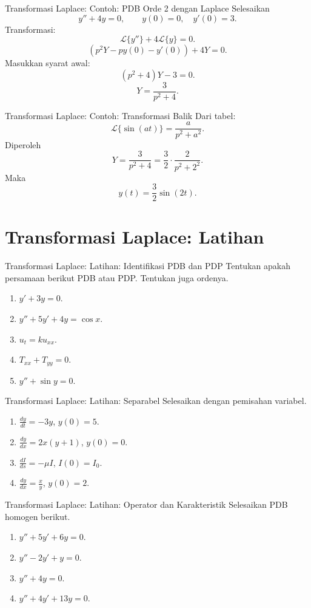 \documentclass[aspectratio=169,11pt]{beamer}
\newcommand{\Lap}{\mathcal{L}}
\begin{document}
\begin{frame}{Transformasi Laplace: Contoh: PDB Orde 2 dengan Laplace}
Selesaikan
\[
y''+4y=0,\qquad y(0)=0,\quad y'(0)=3.
\]
Transformasi:
\[
\Lap\{y''\}+4\Lap\{y\}=0.
\]
\[
(p^2Y-py(0)-y'(0))+4Y=0.
\]
Masukkan syarat awal:
\[
(p^2+4)Y-3=0.
\]
\[
Y=\frac{3}{p^2+4}.
\]
\end{frame}

\begin{frame}{Transformasi Laplace: Contoh: Transformasi Balik}
Dari tabel:
\[
\Lap\{\sin(at)\}=\frac{a}{p^2+a^2}.
\]
Diperoleh
\[
Y=\frac{3}{p^2+4}=\frac{3}{2}\cdot\frac{2}{p^2+2^2}.
\]
Maka
\[
\boxed{y(t)=\frac{3}{2}\sin(2t).}
\]
\end{frame}

\section{Transformasi Laplace: Latihan}

\begin{frame}{Transformasi Laplace: Latihan: Identifikasi PDB dan PDP}
Tentukan apakah persamaan berikut PDB atau PDP. Tentukan juga ordenya.
\begin{enumerate}
  \item $y'+3y=0$.
  \item $y''+5y'+4y=\cos x$.
  \item $u_t=ku_{xx}$.
  \item $T_{xx}+T_{yy}=0$.
  \item $y''+\sin y=0$.
\end{enumerate}
\end{frame}

\begin{frame}{Transformasi Laplace: Latihan: Separabel}
Selesaikan dengan pemisahan variabel.
\begin{enumerate}
  \item $\displaystyle \frac{dy}{dt}=-3y$, $y(0)=5$.
  \item $\displaystyle \frac{dy}{dx}=2x(y+1)$, $y(0)=0$.
  \item $\displaystyle \frac{dI}{ds}=-\mu I$, $I(0)=I_0$.
  \item $\displaystyle \frac{dy}{dx}=\frac{x}{y}$, $y(0)=2$.
\end{enumerate}
\end{frame}

\begin{frame}{Transformasi Laplace: Latihan: Operator dan Karakteristik}
Selesaikan PDB homogen berikut.
\begin{enumerate}
  \item $y''+5y'+6y=0$.
  \item $y''-2y'+y=0$.
  \item $y''+4y=0$.
  \item $y''+4y'+13y=0$.
\end{enumerate}
\end{frame}
\end{document}
